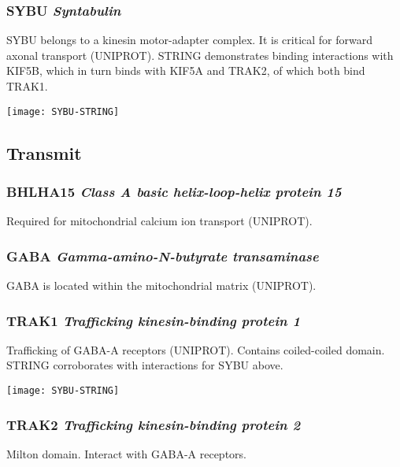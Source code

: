 \subsubsection{SYBU \textit{Syntabulin}}

SYBU belongs to a kinesin motor-adapter complex. It is critical for forward
axonal transport (UNIPROT). STRING demonstrates binding interactions with
KIF5B, which in turn binds with KIF5A and TRAK2, of which both bind TRAK1.

\begin{center}
  \texttt{[image: SYBU-STRING]}
\end{center}

\subsection{Transmit}

\subsubsection{BHLHA15 \textit{Class A basic helix-loop-helix protein 15}}

Required for mitochondrial calcium ion transport (UNIPROT).

\subsubsection{GABA \textit{Gamma-amino-N-butyrate transaminase}}

GABA is located within the mitochondrial matrix (UNIPROT).

\subsubsection{TRAK1 \textit{Trafficking kinesin-binding protein 1}}

Trafficking of GABA-A receptors (UNIPROT). Contains coiled-coiled domain. STRING
corroborates with interactions for SYBU above.

\begin{center}
  \texttt{[image: SYBU-STRING]}
\end{center}

\subsubsection{TRAK2 \textit{Trafficking kinesin-binding protein 2}}

Milton domain. Interact with GABA-A receptors.

